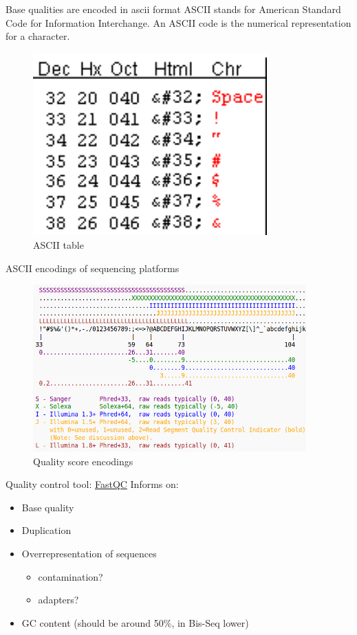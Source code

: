 \documentclass[presentation]{beamer}
\begin{document}
\begin{frame}[label=sec-2-1-8]{Base qualities are encoded in ascii format}
ASCII stands for American Standard Code for Information
Interchange. An ASCII code is the numerical representation for a
character.
\begin{figure}[htb]
\centering
\includegraphics[width=9cm]{asciifullzoomed.png}
\caption{ASCII table}
\end{figure}
\end{frame}



\begin{frame}[label=sec-2-1-9]{ASCII encodings of sequencing platforms}
\begin{figure}[htb]
\centering
\includegraphics[width=10.5cm]{Fastq.png}
\caption{Quality score encodings}
\end{figure}
\end{frame}








\begin{frame}[label=sec-2-1-10]{Quality control tool: \href{http://www.bioinformatics.babraham.ac.uk/projects/fastqc/}{FastQC}}
Informs on:
\begin{itemize}
\item Base quality
\item Duplication
\item Overrepresentation of sequences
\begin{itemize}
\item contamination?
\item adapters?
\end{itemize}
\item GC content (should be around 50\%, in Bis-Seq lower)
\end{itemize}
\end{frame}
\end{document}
